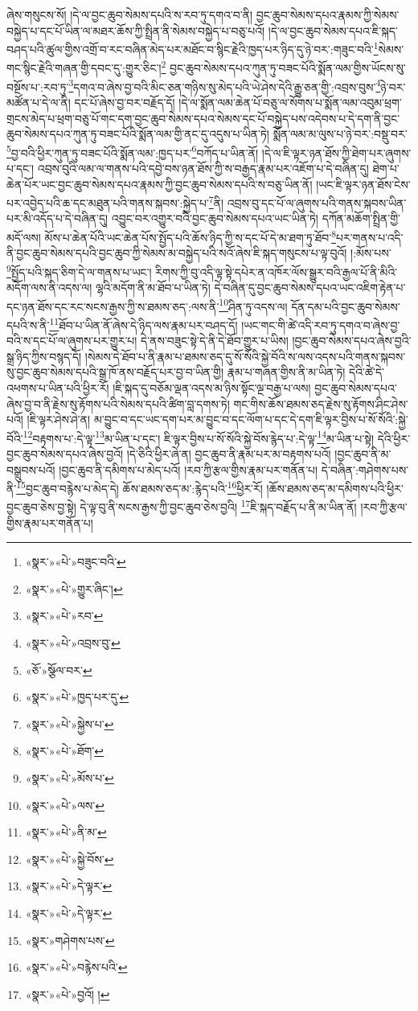 ཞེས་གསུངས་སོ། །དེ་ལ་བྱང་ཆུབ་སེམས་དཔའི་ས་རབ་ཏུ་དགའ་བ་ནི། བྱང་ཆུབ་སེམས་དཔའ་རྣམས་ཀྱི་སེམས་བསྐྱེད་པ་དང་པོ་ཡིན་ལ་མཐར་ཆོས་ཀྱི་སྤྲིན་ནི་སེམས་བསྐྱེད་པ་བཅུ་པའོ། །དེ་ལ་བྱང་ཆུབ་སེམས་དཔའ་ཇི་སྐད་བཤད་པའི་ཚུལ་གྱིས་འགྲོ་བ་རང་བཞིན་མེད་པར་མཐོང་བ་སྙིང་རྗེའི་ཁྱད་པར་ཉིད་དུ་ཉེ་བར་:གཟུང་བའི་\footnote{«སྣར་»«པེ་»བཟུང་བའི་}སེམས་གང་སྙིང་རྗེའི་གཞན་གྱི་དབང་དུ་:གྱུར་ཅིང་།\footnote{«སྣར་»«པེ་»གྱུར་ཞིང་།} བྱང་ཆུབ་སེམས་དཔའ་ཀུན་ཏུ་བཟང་པོའི་སྨོན་ལམ་གྱིས་ཡོངས་སུ་བསྔོས་པ་:རབ་ཏུ་\footnote{«སྣར་»«པེ་»རབ་}དགའ་བ་ཞེས་བྱ་བའི་མིང་ཅན་གཉིས་སུ་མེད་པའི་ཡེ་ཤེས་དེའི་རྒྱུ་ཅན་གྱི་:འབྲས་བུས་\footnote{«སྣར་»«པེ་»འབྲས་བུ་}ཉེ་བར་མཚོན་པ་དེ་ལ་ནི། དང་པོ་ཞེས་བྱ་བར་བརྗོད་དོ། །དེ་ལ་སྨོན་ལམ་ཆེན་པོ་བཅུ་ལ་སོགས་པ་སྨོན་ལམ་འབུམ་ཕྲག་གྲངས་མེད་པ་ཕྲག་བཅུ་པོ་གང་དག་བྱང་ཆུབ་སེམས་དཔའ་སེམས་དང་པོ་བསྐྱེད་པས་འདེབས་པ་དེ་དག་ནི་བྱང་ཆུབ་སེམས་དཔའ་ཀུན་ཏུ་བཟང་པོའི་སྨོན་ལམ་གྱི་ནང་དུ་འདུས་པ་ཡིན་ཏེ། སྨོན་ལམ་མ་ལུས་པ་ཉེ་བར་:བསྡུ་བར་\footnote{«ཅོ་»སྩོལ་བར་}བྱ་བའི་ཕྱིར་ཀུན་ཏུ་བཟང་པོའི་སྨོན་ལམ་:ཁྱད་པར་\footnote{«སྣར་»«པེ་»ཁྱད་པར་དུ་}བཀོད་པ་ཡིན་ནོ། །དེ་ལ་ཇི་ལྟར་ཉན་ཐོས་ཀྱི་ཐེག་པར་ཞུགས་པ་དང་། འབྲས་བུའི་ལམ་ལ་གནས་པའི་དབྱེ་བས་ཉན་ཐོས་ཀྱི་ས་བརྒྱད་རྣམ་པར་འཇོག་པ་དེ་བཞིན་དུ། ཐེག་པ་ཆེན་པོར་ཡང་བྱང་ཆུབ་སེམས་དཔའ་རྣམས་ཀྱི་བྱང་ཆུབ་སེམས་དཔའི་ས་བཅུ་ཡིན་ནོ། །ཡང་ཇི་ལྟར་ཉན་ཐོས་ངེས་པར་འབྱེད་པའི་ཆ་དང་མཐུན་པའི་གནས་སྐབས་:སྐྱེད་པ་\footnote{«སྣར་»«པེ་»སྐྱེས་པ་}ནི། འབྲས་བུ་དང་པོ་ལ་ཞུགས་པའི་གནས་སྐབས་ཡིན་པར་མི་འདོད་པ་དེ་བཞིན་དུ། འབྱུང་བར་འགྱུར་བའི་བྱང་ཆུབ་སེམས་དཔའ་ཡང་ཡིན་ཏེ། དཀོན་མཆོག་སྤྲིན་གྱི་མདོ་ལས། མོས་པ་ཆེན་པོའི་ཡང་ཆེན་པོས་སྤྱོད་པའི་ཆོས་ཉིད་ཀྱི་ས་དང་པོ་དེ་མ་ཐག་ཏུ་ཐོབ་\footnote{«སྣར་»«པེ་»ཐོག་}པར་གནས་པ་འདི་ནི་བྱང་ཆུབ་སེམས་དཔའི་བྱང་ཆུབ་ཀྱི་སེམས་མ་བསྐྱེད་པའི་སའོ་ཞེས་ཇི་སྐད་གསུངས་པ་ལྟ་བུའོ། །:མོས་པས་\footnote{«སྣར་»«པེ་»མོས་པ་}སྤྱོད་པའི་སྐད་ཅིག་དེ་ལ་གནས་པ་ཡང་། རིགས་ཀྱི་བུ་འདི་ལྟ་སྟེ་དཔེར་ན་འཁོར་ལོས་སྒྱུར་བའི་རྒྱལ་པོ་ནི་མིའི་མདོག་ལས་ནི་འདས་ལ། ལྷའི་མདོག་ནི་མ་ཐོབ་པ་ཡིན་ཏེ། དེ་བཞིན་དུ་བྱང་ཆུབ་སེམས་དཔའ་ཡང་འཇིག་རྟེན་པ་དང་ཉན་ཐོས་དང་རང་སངས་རྒྱས་ཀྱི་ས་ཐམས་ཅད་:ལས་ནི་\footnote{«སྣར་»«པེ་»ལས་}ཤིན་ཏུ་འདས་ལ། དོན་དམ་པའི་བྱང་ཆུབ་སེམས་དཔའི་ས་ནི་\footnote{«སྣར་»«པེ་»ནི་མ་}ཐོབ་པ་ཡིན་ནོ་ཞེས་དེ་ཉིད་ལས་རྣམ་པར་བཤད་དོ། །ཡང་གང་གི་ཚེ་འདི་རབ་ཏུ་དགའ་བ་ཞེས་བྱ་བའི་ས་དང་པོ་ལ་ཞུགས་པར་གྱུར་པ། དེ་ནས་བཟུང་སྟེ་དེ་ནི་དེ་ཐོབ་གྱུར་པ་ཡིས། །བྱང་ཆུབ་སེམས་དཔའ་ཞེས་བྱའི་སྒྲ་ཉིད་ཀྱིས་བསྙད་དོ། །སེམས་དེ་ཐོབ་པ་ནི་རྣམ་པ་ཐམས་ཅད་དུ་སོ་སོའི་སྐྱེ་བོའི་ས་ལས་འདས་པའི་གནས་སྐབས་སུ་བྱང་ཆུབ་སེམས་དཔའི་སྒྲ་ཁོ་ནས་བརྗོད་པར་བྱ་བ་ཡིན་གྱི། རྣམ་པ་གཞན་གྱིས་ནི་མ་ཡིན་ཏེ། དེའི་ཚེ་དེ་འཕགས་པ་ཡིན་པའི་ཕྱིར་རོ། །ཇི་སྐད་དུ་བཅོམ་ལྡན་འདས་མ་ཉིས་སྟོང་ལྔ་བརྒྱ་པ་ལས། བྱང་ཆུབ་སེམས་དཔའ་ཞེས་བྱ་བ་ནི་རྗེས་སུ་རྟོགས་པའི་སེམས་དཔའི་ཚིག་བླ་དགས་ཏེ། གང་གིས་ཆོས་ཐམས་ཅད་རྗེས་སུ་རྟོགས་ཤིང་ཤེས་པའོ། །ཇི་ལྟར་ཤེས་ཤེ་ན། མ་བྱུང་བ་དང་ཡང་དག་པར་མ་བྱུང་བ་དང་ལོག་པ་དང་དེ་དག་ཇི་ལྟར་བྱིས་པ་སོ་སོའི་:སྐྱེ་བོའི་\footnote{«སྣར་»«པེ་»སྐྱེ་བོས་}བརྟགས་པ་:དེ་ལྟ་\footnote{«སྣར་»«པེ་»དེ་ལྟར་}མ་ཡིན་པ་དང་། ཇི་ལྟར་བྱིས་པ་སོ་སོའི་སྐྱེ་བོས་རྙེད་པ་:དེ་ལྟ་\footnote{«སྣར་»«པེ་»དེ་ལྟར་}མ་ཡིན་པ་སྟེ། དེའི་ཕྱིར་བྱང་ཆུབ་སེམས་དཔའ་ཞེས་བྱའོ། །དེ་ཅིའི་ཕྱིར་ཞེ་ན། བྱང་ཆུབ་ནི་རྣམ་པར་མ་བརྟགས་པའོ། །བྱང་ཆུབ་ནི་མ་བསྒྲུབས་པའོ། །བྱང་ཆུབ་ནི་དམིགས་པ་མེད་པའོ། །རབ་ཀྱི་རྩལ་གྱིས་རྣམ་པར་གནོན་པ། དེ་བཞིན་:གཤེགས་པས་ནི་\footnote{«སྣར་»གཤེགས་པས་}བྱང་ཆུབ་བརྙེས་པ་མེད་དེ། ཆོས་ཐམས་ཅད་མ་:རྙེད་པའི་\footnote{«སྣར་»«པེ་»བརྙེས་པའི་}ཕྱིར་རོ། །ཆོས་ཐམས་ཅད་མ་དམིགས་པའི་ཕྱིར་བྱང་ཆུབ་ཅེས་བྱ་སྟེ། དེ་ལྟ་བུ་ནི་སངས་རྒྱས་ཀྱི་བྱང་ཆུབ་ཅེས་བྱའི། \footnote{«སྣར་»«པེ་»བྱའོ། ། }ཇི་སྐད་བརྗོད་པ་ནི་མ་ཡིན་ནོ། །རབ་ཀྱི་རྩལ་གྱིས་རྣམ་པར་གནོན་པ། 